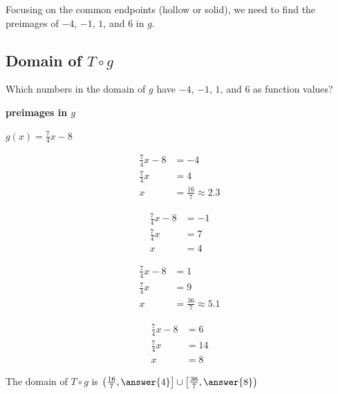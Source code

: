 \documentclass{ximera}
\begin{document}
Focusing on the common endpoints (hollow or solid), we need to find the preimages of $-4$, $-1$, $1$, and $6$ in $g$. 

















\subsection*{Domain of $T \circ g$}

Which numbers in the domain of $g$ have $-4$, $-1$, $1$, and $6$ as function values? 


\begin{explanation} \textbf{\textcolor{red!75!green}{preimages in $g$}} 


$g(x) = \frac{7}{4}x -8$



\begin{align*}
\frac{7}{4}x -8 &= -4 \\
\frac{7}{4}x    &= 4 \\
x &= \frac{16}{7} \approx 2.3
\end{align*}


\begin{align*}
\frac{7}{4}x -8 &= -1 \\
\frac{7}{4}x    &= 7 \\
x &= 4
\end{align*}


\begin{align*}
\frac{7}{4}x -8 &= 1 \\
\frac{7}{4}x    &= 9 \\
x &= \frac{36}{7} \approx 5.1
\end{align*}


\begin{align*}
\frac{7}{4}x -8 &= 6 \\
\frac{7}{4}x    &= 14 \\
x &= 8
\end{align*}





The domain of $T \circ g$ is $\left( \frac{16}{7}, \answer{4} \right] \cup \left[ \frac{36}{7}, \answer{8} \right)$ 


\end{explanation}
\end{document}
